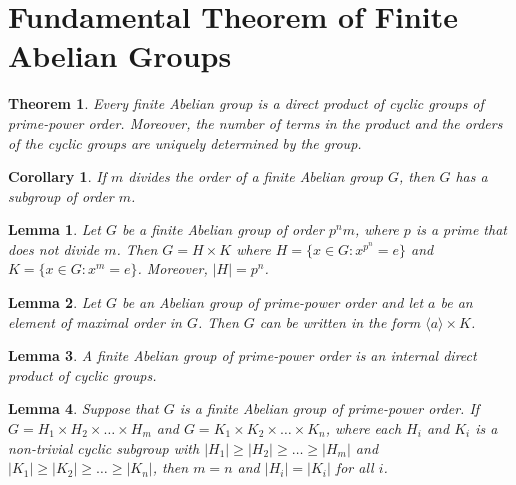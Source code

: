 \documentclass{article}
\newtheorem{theorem}{Theorem}[section]
\newtheorem*{lemma}{Lemma}
\newtheorem*{corollary}{Corollary}
\theoremstyle{definition}
\begin{document}
\section{Fundamental Theorem of Finite Abelian Groups}

\begin{theorem}
    Every finite Abelian group is a direct product of cyclic groups of prime-power order. Moreover, the number of terms in the product and the orders of the cyclic groups are uniquely determined by the group.
\end{theorem}

\begin{corollary}
    If $m$ divides the order of a finite Abelian group $G$, then $G$ has a subgroup of order $m$.
\end{corollary}

\begin{lemma}
    Let $G$ be a finite Abelian group of order $p^nm$, where $p$ is a prime that does not divide $m$. Then $G = H \times K$ where $H = \{x \in G : x^{p^n} = e\}$ and $K = \{x \in G : x^m = e\}$. Moreover, $|H| = p^n$.
\end{lemma}

\begin{lemma}
    Let $G$ be an Abelian group of prime-power order and let $a$ be an element of maximal order in $G$. Then $G$ can be written in the form $\langle a \rangle \times K$.
\end{lemma}

\begin{lemma}
    A finite Abelian group of prime-power order is an internal direct product of cyclic groups.
\end{lemma}

\begin{lemma}
    Suppose that $G$ is a finite Abelian group of prime-power order. If $G = H_1 \times H_2 \times \dots \times H_m$ and $G = K_1 \times K_2 \times \dots \times K_n$, where each $H_i$ and $K_i$ is a non-trivial cyclic subgroup with $|H_1| \geq |H_2| \geq \dots \geq |H_m|$ and $|K_1| \geq |K_2| \geq \dots \geq |K_n|$, then $m = n$ and $|H_i| = |K_i|$ for all $i$.
\end{lemma}
\end{document}
